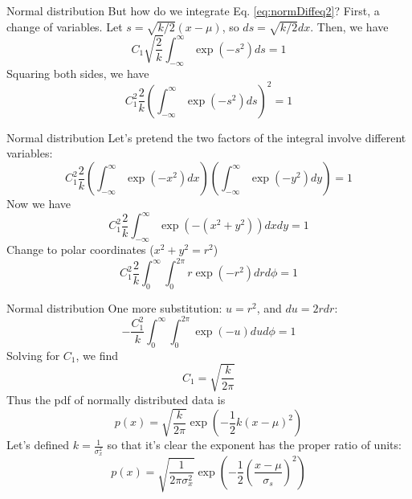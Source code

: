 \documentclass{beamer}
\begin{document}
\begin{frame}{Normal distribution}
But how do we integrate Eq. \ref{eq:normDiffeq2}?  First, a change of variables.  Let $s = \sqrt{k/2}(x-\mu)$, so $ds = \sqrt{k/2}dx$.  Then, we have
\begin{equation}
C_1 \sqrt{\frac{2}{k}} \int_{-\infty}^{\infty} \exp(-s^2) ds = 1
\end{equation}
Squaring both sides, we have
\begin{equation}
C_1^2 \frac{2}{k} \left(\int_{-\infty}^{\infty} \exp(-s^2) ds\right)^2 = 1
\end{equation}
\end{frame}

\begin{frame}{Normal distribution}
Let's pretend the two factors of the integral involve different variables:
\begin{equation}
C_1^2 \frac{2}{k} \left(\int_{-\infty}^{\infty} \exp(-x^2) dx\right)\left(\int_{-\infty}^{\infty} \exp(-y^2) dy\right) = 1
\end{equation}
Now we have
\begin{equation}
C_1^2 \frac{2}{k} \int_{-\infty}^{\infty} \exp(-(x^2+y^2)) dx dy = 1
\end{equation}
Change to polar coordinates ($x^2 + y^2 = r^2$)
\begin{equation}
C_1^2 \frac{2}{k} \int_{0}^{\infty} \int_0^{2\pi} r\exp(-r^2) dr d\phi = 1
\end{equation}
\end{frame}

\begin{frame}{Normal distribution}
One more substitution: $u = r^2$, and $du = 2rdr$:
\begin{equation}
-\frac{C_1^2}{k} \int_0^{\infty}\int_0^{2\pi} \exp(-u) du d\phi = 1
\end{equation}
Solving for $C_1$, we find
\begin{equation}
C_1 = \sqrt{\frac{k}{2\pi}}
\end{equation}
Thus the pdf of normally distributed data is
\begin{equation}
p(x) = \sqrt{\frac{k}{2\pi}} \exp\left(-\frac{1}{2}k(x-\mu)^2\right)
\end{equation}
Let's defined $k = \frac{1}{\sigma_x^2}$ so that it's clear the exponent has the proper ratio of units:
\begin{equation}
\boxed{
p(x) = \sqrt{\frac{1}{2\pi\sigma_x^2}} \exp\left(-\frac{1}{2}\left(\frac{x-\mu}{\sigma_s}\right)^2\right)}
\end{equation}
\end{frame}
\end{document}
